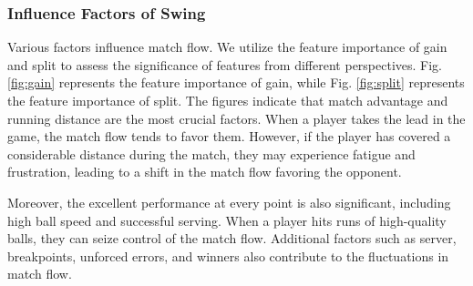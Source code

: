 \documentclass{mcmthesis}
\begin{document}
\subsubsection{Influence Factors of Swing}
Various factors influence match flow. We utilize the feature importance of gain and split to assess the significance of features from different perspectives. Fig. \ref{fig:gain} represents the feature importance of gain, while Fig. \ref{fig:split} represents the feature importance of split. The figures indicate that match advantage and running distance are the most crucial factors. When a player takes the lead in the game, the match flow tends to favor them. However, if the player has covered a considerable distance during the match, they may experience fatigue and frustration, leading to a shift in the match flow favoring the opponent.

Moreover, the excellent performance at every point is also significant, including high ball speed and successful serving. When a player hits runs of high-quality balls, they can seize control of the match flow. Additional factors such as server, breakpoints, unforced errors, and winners also contribute to the fluctuations in match flow.         
\end{document}
